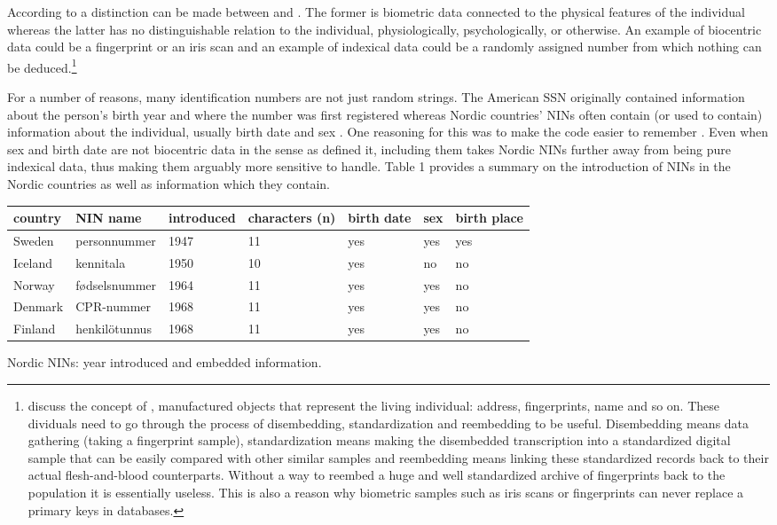 According to \citet{Alterman2003} a distinction can be made between  and . The former is biometric data connected to the physical features of the individual whereas the latter has no distinguishable relation to the individual, physiologically, psychologically, or otherwise. An example of biocentric data could be a fingerprint or an iris scan and an example of indexical data could be a randomly assigned number from which nothing can be deduced.\footnote{\citet{brensinger2021} discuss the concept of , manufactured objects that represent the living individual: address, fingerprints, name and so on. These dividuals need to go through the process of disembedding, standardization and reembedding to be useful. Disembedding means data gathering (taking a fingerprint sample), standardization means making the disembedded transcription into a standardized digital sample that can be easily compared with other similar samples and reembedding means linking these standardized records back to their actual flesh-and-blood counterparts. Without a way to reembed a huge and well standardized archive of fingerprints back to the population it is essentially useless. This is also a reason why biometric samples such as iris scans or fingerprints can never replace a primary keys in databases.}

For a number of reasons, many identification numbers are not just random strings. The American SSN originally contained information about the person's birth year and where the number was first registered \citep[32]{brensinger2021} whereas Nordic countries' NINs often contain (or used to contain) information about the individual, usually birth date and sex \citep{watson2010, salste2021}. One reasoning for this was to make the code easier to remember \citep{alastalo2022}. Even when sex and birth date are not biocentric data in the sense as \citep{Alterman2003} defined it, including them takes Nordic NINs further away from being pure indexical data, thus making them arguably more sensitive to handle. Table 1 provides a summary on the introduction of NINs in the Nordic countries as well as information which they contain.

\begin{widetable}[ht]
\centering
\begin{tabular}{lllllll}
\toprule
  country & NIN name & introduced & characters (n) & birth date & sex & birth place \\
  \hline
  Sweden & personnummer & 1947 & 11 & yes & yes & yes\\
  Iceland & kennitala & 1950 & 10 & yes & no & no \\
  Norway & fødselsnummer & 1964 & 11 & yes & yes & no \\
  Denmark & CPR-nummer & 1968 & 11 & yes & yes & no \\
  Finland & henkilötunnus & 1968 & 11 & yes & yes & no \\
\bottomrule
\end{tabular}
\caption{Nordic NINs: year introduced and embedded information.}
\label{tab:nordiccomparison}
\end{widetable}

